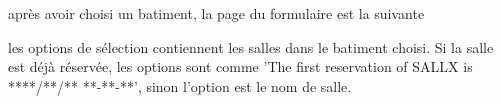\documentclass{article}
\begin{document}
\begin{enumerate}
  après avoir choisi un batiment, la page du formulaire est la suivante
  
  
  \vspace{0.7cm}
   
\hspace*{-0.7in}
               \noindent{}   
  
  les options de sélection contiennent les salles dans le batiment choisi. Si la salle est déjà réservée, les options sont comme 'The first reservation of SALLX is ****/**/** **-**-**', sinon l'option est le nom de salle.
  
  \vspace{0.7cm}
   
\hspace*{-0.7in}
               \noindent{}  
  

\end{enumerate}
\end{document}
